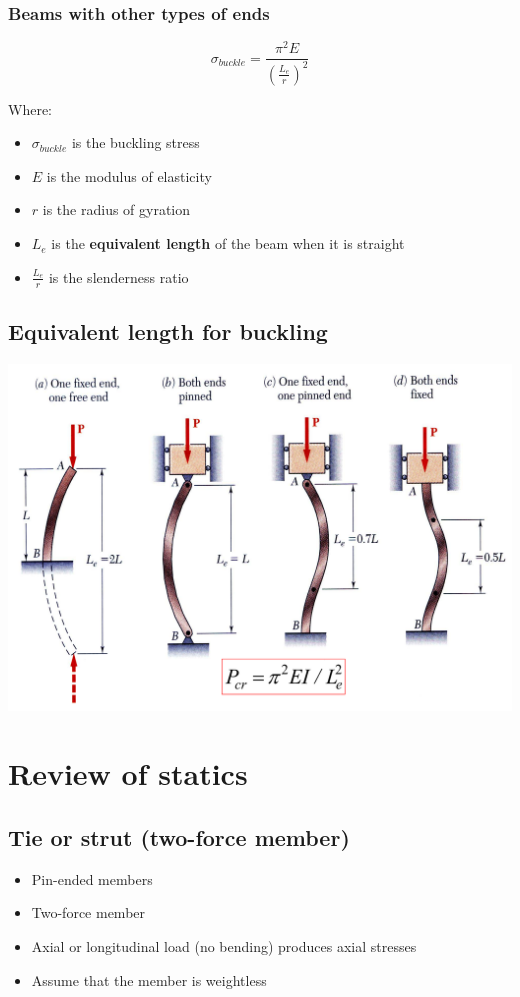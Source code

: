\documentclass[11pt]{article}
\begin{document}
\subsubsection{Beams with other types of ends}
\label{sec:orga8141f3}
\[\sigma_{buckle} = \frac{\pi^2 E}{\left( \frac{L_e}{r} \right)^2}\]

Where:
\begin{itemize}
\item \(\sigma_{buckle}\) is the buckling stress
\item \(E\) is the modulus of elasticity
\item \(r\) is the radius of gyration
\item \(L_e\) is the \textbf{equivalent length} of the beam when it is straight
\item \(\frac{L_e}{r}\) is the slenderness ratio
\end{itemize}
\subsection{Equivalent length for buckling}
\label{sec:orgf3cbcbf}
\begin{center}
\includegraphics[width=.9\linewidth]{./images/beam-buckling.png}
\end{center}

\newpage
\section{Review of statics}
\label{sec:orgd19f099}

\subsection{Tie or strut (two-force member)}
\label{sec:org0ea3085}
\begin{itemize}
\item Pin-ended members
\item Two-force member
\item Axial or longitudinal load (no bending) produces axial stresses
\item Assume that the member is weightless
\end{itemize}
\end{document}

